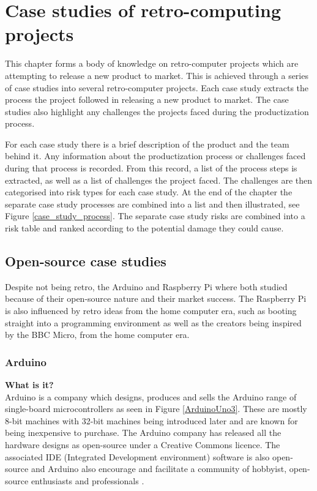 

\chapter{Case studies of retro-computing projects}
\label{Chapter3}
This chapter forms a body of knowledge on retro-computer projects which are attempting to release a new product to market. This is achieved through a series of case studies into several retro-computer projects. Each case study extracts the process the project followed in releasing a new product to market. The case studies also highlight any challenges the projects faced during the productization process. 

For each case study there is a brief description of the product and the team behind it. Any information about the productization process or challenges faced during that process is recorded. From this record, a list of the process steps is extracted, as well as a list of challenges the project faced. The challenges are then categorised into risk types for each case study. At the end of the chapter the separate case study processes are combined into a list and then illustrated, see Figure \ref{case_study_process}. The separate case study risks are combined into a risk table and ranked according to the potential damage they could cause. 

\section{Open-source case studies}
Despite not being retro, the Arduino and Raspberry Pi where both studied because of their open-source nature and their market success. The Raspberry Pi is also influenced by retro ideas from the home computer era, such as booting straight into a programming environment as well as the creators being inspired by the BBC Micro, from the home computer era.

\subsection{Arduino}
\textbf{What is it?}\\
Arduino is a company which designs, produces and sells the Arduino range of single-board microcontrollers as seen in Figure \ref{ArduinoUno3}. These are mostly 8-bit machines with 32-bit machines being introduced later and are known for being inexpensive to purchase. The Arduino company has released all the hardware designs as open-source under a Creative Commons licence. The associated IDE (Integrated Development environment) software is also open-source and Arduino also encourage and facilitate a community of hobbyist, open-source enthusiasts and professionals 
\cite{RN133}. \\

